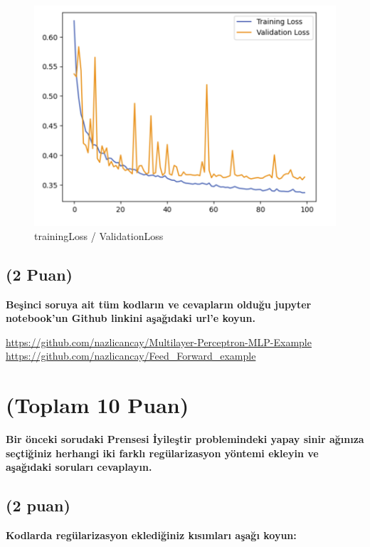 \documentclass[11pt]{article}
\begin{document}
\begin{figure}[ht!]
    \centering
    \includegraphics{picture2.png}
    \caption{trainingLoss / ValidationLoss}
    \label{fig:my_pic}
\end{figure}


\subsection{(2 Puan)} \textbf{Beşinci soruya ait tüm kodların ve cevapların olduğu jupyter notebook'un Github linkini aşağıdaki url'e koyun.}

\url{https://github.com/nazlicancay/Multilayer-Perceptron-MLP-Example} \\
\url{https://github.com/nazlicancay/Feed_Forward_example}

\section{(Toplam 10 Puan)} \textbf{Bir önceki sorudaki Prensesi İyileştir problemindeki yapay sinir ağınıza seçtiğiniz herhangi iki farklı regülarizasyon yöntemi ekleyin ve aşağıdaki soruları cevaplayın.} 

\subsection{(2 puan)} \textbf{Kodlarda regülarizasyon eklediğiniz kısımları aşağı koyun:} 
\end{document}
